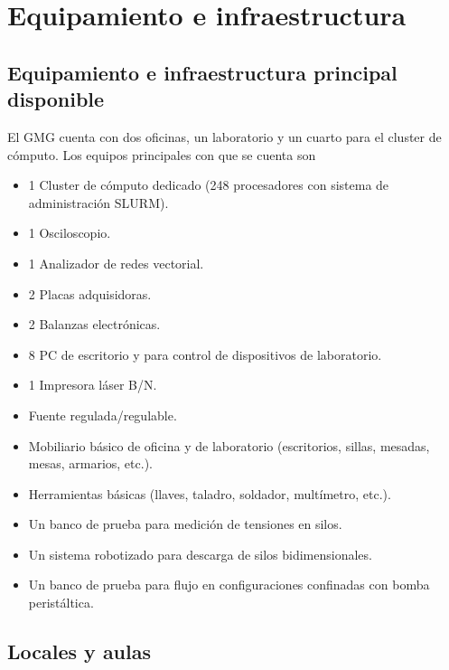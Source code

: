 \documentclass[a4paper,11pt,twoside,final,titlepage,onecolumn,openright]{report}
\begin{document}
\normalsize
\vspace{0.5cm}


\section{Equipamiento e infraestructura}

\subsection{Equipamiento e infraestructura principal disponible}

El GMG cuenta con dos oficinas, un laboratorio y un cuarto para el cluster de cómputo. Los equipos principales con que se cuenta son

\begin{itemize}
 \item 1 Cluster de cómputo dedicado (248 procesadores con sistema de administración SLURM).
 \item 1 Osciloscopio.
 \item 1 Analizador de redes vectorial.
 \item 2 Placas adquisidoras.
 \item 2 Balanzas electrónicas.
 \item 8 PC de escritorio y para control de dispositivos de laboratorio.
 \item 1 Impresora láser B/N.
 \item Fuente regulada/regulable.
 \item Mobiliario básico de oficina y de laboratorio (escritorios, sillas, mesadas, mesas, armarios, etc.).
 \item Herramientas básicas (llaves, taladro, soldador, multímetro, etc.).
 \item Un banco de prueba para medición de tensiones en silos.
 \item Un sistema robotizado para descarga de silos bidimensionales.
 \item Un banco de prueba para flujo en configuraciones confinadas con bomba peristáltica.
\end{itemize}


\subsection{Locales y aulas}
\end{document}
